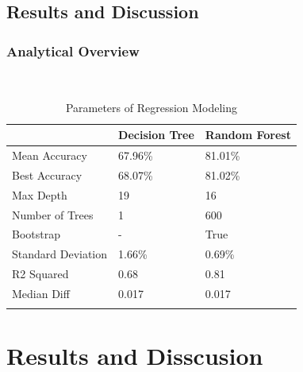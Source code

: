 \documentclass{beamer}
\begin{document}
\subsection{Results and Discussion}

\begin{frame}
	\frametitle{Analytical Overview}
    \begin{table}[ht]\
        \caption*{Parameters of Regression Modeling} %
        \centering %
        \begin{tabular}{l l l} %
        \hline\hline %
         &Decision Tree & Random Forest\\ [0.5ex] %
        \hline %
        Mean Accuracy& 67.96\%  & 81.01\%  \\ %
        Best Accuracy & 68.07\% & 81.02\%  \\
        Max Depth & 19 & 16  \\
        Number of Trees &  1 & 600  \\
        Bootstrap &  - & True  \\
        Standard Deviation &   1.66\% & 0.69\%  \\
        R2 Squared &  0.68 & 0.81  \\
        Median Diff &  0.017 & 0.017  \\ [1ex] %
        \hline %
        \\
        \end{tabular}
        \end{table}
        \end{frame}
\section{Results and Disscusion}
\end{document}
